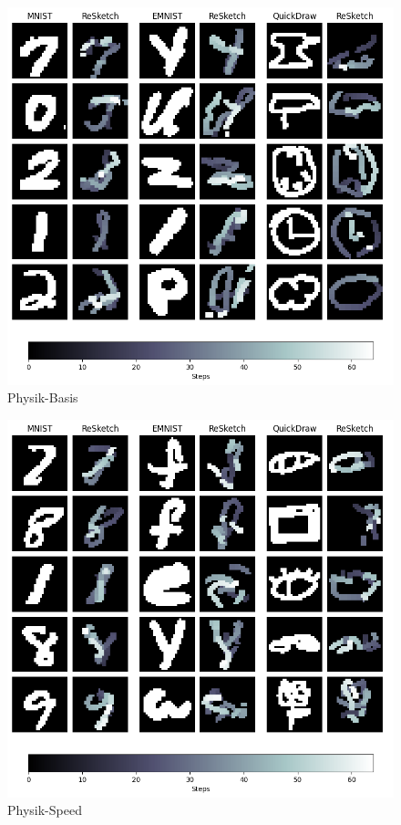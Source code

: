 
\begin{figure}[!ht]
    \centering
    \includegraphics[width=\textwidth]{images/resultate/physics-base.png}
    \caption{Physik-Basis}
    \label{fig:Physik-Basis}
\end{figure}

\begin{figure}[!ht]
    \centering
    \includegraphics[width=\textwidth]{images/resultate/physics-speed.png}
    \caption{Physik-Speed}
    \label{fig:Physik-Speed}
\end{figure}
